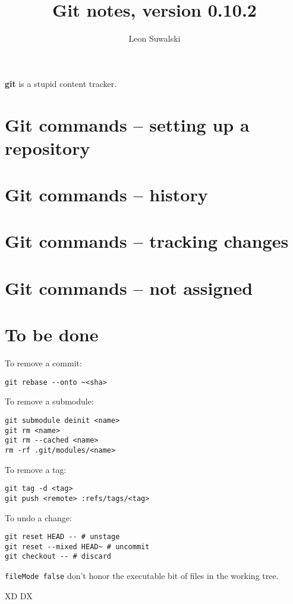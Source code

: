 \documentclass{charuun}
\title{Git notes, version 0.10.2}
\author{Leon Suwalski}
\begin{document}
\maketitle
\raggedright

\textbf{git} is a stupid content tracker.

\section{Git commands -- setting up a repository}



\section{Git commands -- history}






\section{Git commands -- tracking changes}




\section{Git commands -- not assigned}



















\section{To be done}
To remove a commit:
\begin{verbatim}
git rebase --onto ~<sha>
\end{verbatim}

To remove a submodule:
\begin{verbatim}
git submodule deinit <name>
git rm <name>
git rm --cached <name>
rm -rf .git/modules/<name>
\end{verbatim}

To remove a tag:
\begin{verbatim}
git tag -d <tag>
git push <remote> :refs/tags/<tag>
\end{verbatim}

To undo a change:
\begin{verbatim}
git reset HEAD -- # unstage
git reset --mixed HEAD~ # uncommit
git checkout -- # discard
\end{verbatim}

\texttt{fileMode false} don't honor the executable bit of files in the working tree.



XD
DX
\end{document}
